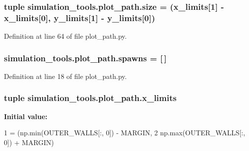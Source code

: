 \subsubsection[{\texorpdfstring{size}{size}}]{\setlength{\rightskip}{0pt plus 5cm}tuple simulation\+\_\+tools.\+plot\+\_\+path.\+size = ({\bf x\+\_\+limits}\mbox{[}1\mbox{]} -\/ {\bf x\+\_\+limits}\mbox{[}0\mbox{]}, {\bf y\+\_\+limits}\mbox{[}1\mbox{]} -\/ {\bf y\+\_\+limits}\mbox{[}0\mbox{]})}\hypertarget{namespacesimulation__tools_1_1plot__path_ad669b594ec1c564d7c50a086fa97ab52}{}\label{namespacesimulation__tools_1_1plot__path_ad669b594ec1c564d7c50a086fa97ab52}


Definition at line 64 of file plot\+\_\+path.\+py.

\subsubsection[{\texorpdfstring{spawns}{spawns}}]{\setlength{\rightskip}{0pt plus 5cm}simulation\+\_\+tools.\+plot\+\_\+path.\+spawns = \mbox{[}$\,$\mbox{]}}\hypertarget{namespacesimulation__tools_1_1plot__path_ae4cd76527e66dbb4471b94b4a6a86b4f}{}\label{namespacesimulation__tools_1_1plot__path_ae4cd76527e66dbb4471b94b4a6a86b4f}


Definition at line 18 of file plot\+\_\+path.\+py.

\subsubsection[{\texorpdfstring{x\+\_\+limits}{x_limits}}]{\setlength{\rightskip}{0pt plus 5cm}tuple simulation\+\_\+tools.\+plot\+\_\+path.\+x\+\_\+limits}\hypertarget{namespacesimulation__tools_1_1plot__path_a3f392b0b6695e4825d03441dce1f06a7}{}\label{namespacesimulation__tools_1_1plot__path_a3f392b0b6695e4825d03441dce1f06a7}
{\bfseries Initial value\+:}
\begin{DoxyCode}
1 = (np.min(OUTER\_WALLS[:, 0]) - MARGIN,
2             np.max(OUTER\_WALLS[:, 0]) + MARGIN)
\end{DoxyCode}


